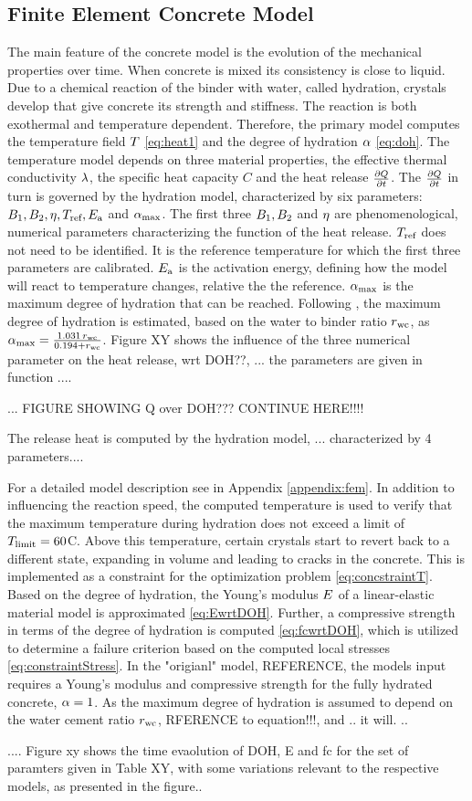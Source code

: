 \subsection{Finite Element Concrete Model}
The main feature of the concrete model is the evolution of the mechanical properties over time.
When concrete is mixed its consistency is close to liquid.
Due to a chemical reaction of the binder with water, called hydration, crystals develop that give concrete its strength and stiffness.
The reaction is both exothermal and temperature dependent.
Therefore, the primary model computes the temperature field $T$ \eqref{eq:heat1} and the degree of hydration $\alpha$ \eqref{eq:doh}.
The temperature model depends on three material properties, the effective thermal conductivity $\lambda$, the specific heat capacity $C$ and the heat release $\frac{\partial Q}{\partial t}$.
The $\frac{\partial Q}{\partial t}$ in turn is governed by the hydration model, characterized by six parameters:
$B_1, B_2, \eta, T_{\text{ref}}, E_{\text{a}}$ and $\alpha_{\text{max}}$.
The first three $B_1, B_2$ and $\eta$ are phenomenological, numerical parameters characterizing the function of the heat release.
$T_{\text{ref}}$ does not need to be identified.
It is the reference temperature for which the first three parameters are calibrated.
$E_{\text{a}}$ is the activation energy, defining how the model will react to temperature changes, relative the the reference. 
$\alpha_{\text{max}}$ is the maximum degree of hydration that can be reached.
Following \cite{Mills1966fico}, the maximum degree of hydration is estimated, based on the water to binder ratio $r_{\text{wc}}$, as $\alpha_{\text{max}} = \frac{1.031\,r_{\text{wc}}}{0.194 + r_{\text{wc}}}$.
Figure XY shows the influence of the three numerical parameter on the heat release, wrt DOH??, ... the parameters are given in function ....




...
FIGURE SHOWING Q over DOH???
CONTINUE HERE!!!!

The release heat is computed by the hydration model, ... characterized by 4 parameters....

For a detailed model description see in Appendix \ref{appendix:fem}.
In addition to influencing the reaction speed, the computed temperature is used to verify that the maximum temperature during hydration does not exceed a limit of $T_{\text{limit}} = 60$\textdegree C.
Above this temperature, certain crystals start to revert back to a different state, expanding in volume and leading to cracks in the concrete.
This is implemented as a constraint for the optimization problem \eqref{eq:concstraintT}.
Based on the degree of hydration, the Young's modulus $E$ of a linear-elastic material model
is approximated \eqref{eq:EwrtDOH}.
Further, a compressive strength in terms of the degree of hydration is computed \eqref{eq:fcwrtDOH}, which is utilized to determine a failure criterion based on the computed local stresses \eqref{eq:constraintStress}.
In the "origianl" model, REFERENCE, the models input requires a Young's modulus and compressive strength for the fully hydrated concrete, $\alpha = 1$.
As the maximum degree of hydration is assumed to depend on the water cement ratio $r_{\text{wc}}$, RFERENCE to equation!!!, and .. it will.
..  


....
Figure xy shows the time evaolution of DOH, E and fc for the set of paramters given in Table XY, with some variations relevant to the respective models, as presented in the figure..



